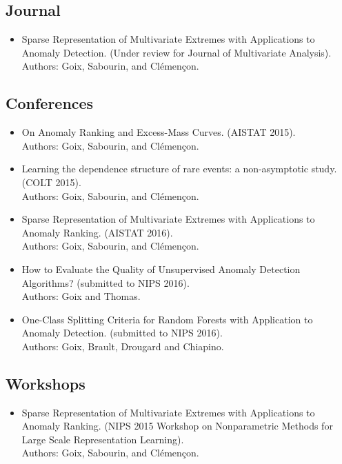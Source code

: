 \begin{listpublis}

\subsection*{Journal}
\begin{itemize}
\item Sparse Representation of Multivariate Extremes with Applications to Anomaly Detection. (Under review for Journal of Multivariate Analysis).\\
Authors: Goix, Sabourin, and Clémençon.
\end{itemize}

\subsection*{Conferences}
\begin{itemize}
\item On Anomaly Ranking and Excess-Mass Curves. (AISTAT 2015).\\
Authors: Goix, Sabourin, and Clémençon. 

\item Learning the dependence structure of rare events: a non-asymptotic study. (COLT 2015).\\
Authors: Goix, Sabourin, and Clémençon.

\item Sparse Representation of Multivariate Extremes with Applications to Anomaly Ranking. (AISTAT 2016).\\
Authors: Goix, Sabourin, and Clémençon.

\item How to Evaluate the Quality of Unsupervised Anomaly Detection Algorithms? (submitted to NIPS 2016).\\ Authors: Goix and Thomas. 

\item One-Class Splitting Criteria for Random Forests with Application to Anomaly Detection. (submitted to NIPS 2016).\\
Authors: Goix, Brault, Drougard and Chiapino.
\end{itemize}


\subsection*{Workshops}
\begin{itemize}
\item Sparse Representation of Multivariate Extremes with Applications to Anomaly Ranking. (NIPS 2015 Workshop on Nonparametric Methods for Large Scale Representation Learning).\\
Authors: Goix, Sabourin, and Clémençon.


\end{itemize}
\end{listpublis}
